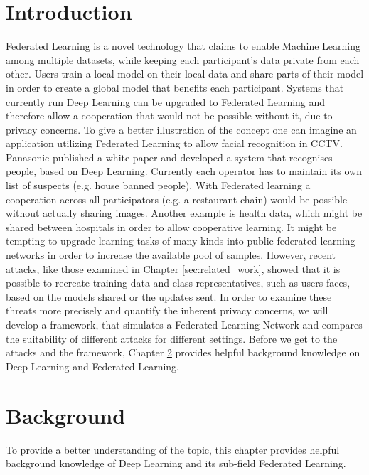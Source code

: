 \documentclass[
	ngerman,
	ruledheaders=section,%
	class=report,%
	thesis={type=bachelor},%
	accentcolor=1b,%
	custommargins=true,%
	marginpar=false,%
	parskip=half-,%
	fontsize=11pt,%
]{tudapub}
\begin{document}
\tableofcontents

\chapter{Introduction}\label{sec:introduction}
Federated Learning is a novel technology that claims to enable Machine Learning among multiple datasets, while keeping each participant's data private from each other. Users train a local model on their local data and share parts of their model in order to create a global model that benefits each participant. Systems that currently run Deep Learning can be upgraded to Federated Learning and therefore allow a cooperation that would not be possible without it, due to privacy concerns. To give a better illustration of the concept one can imagine an application utilizing Federated Learning to allow facial recognition in CCTV. Panasonic published a white paper \cite{panasonic} and developed a system that recognises people, based on Deep Learning. Currently each operator has to maintain its own list of suspects (e.g. house banned people). With Federated learning a cooperation across all participators (e.g. a restaurant chain) would be possible without actually sharing images. Another example is health data, which might be shared between hospitals in order to allow cooperative learning. It might be tempting to upgrade learning tasks of many kinds into public federated learning networks in order to increase the available pool of samples. However, recent attacks, like those examined in Chapter \ref{sec:related_work}, showed that it is possible to recreate training data and class representatives, such as users faces, based on the models shared or the updates sent. In order to examine these threats more precisely and quantify the inherent privacy concerns, we will develop a framework, that simulates a Federated Learning Network and compares the suitability of different attacks for different settings. Before we get to the attacks and the framework, Chapter \ref{sec:background} provides helpful background knowledge on Deep Learning and Federated Learning.


\chapter{Background}\label{sec:background}
To provide a better understanding of the topic, this chapter provides helpful background knowledge of Deep Learning and its sub-field Federated Learning.
\end{document}

